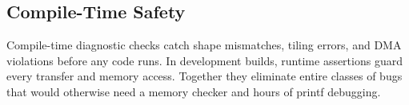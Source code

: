 \subsection*{Compile-Time Safety}

Compile-time diagnostic checks catch shape mismatches, tiling errors, and DMA violations before any code runs. In development builds, runtime assertions guard every transfer and memory access. Together they eliminate entire classes of bugs that would otherwise need a memory checker and hours of printf debugging.
